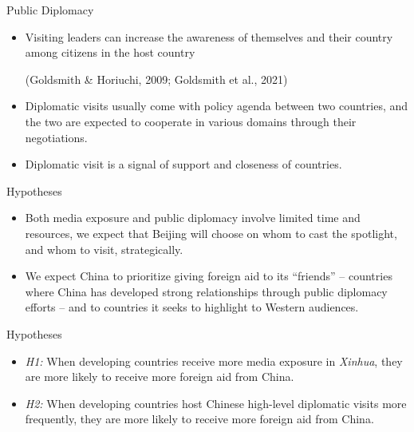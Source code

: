 \documentclass{beamer}
\begin{document}
\begin{frame}{Public Diplomacy}


\begin{itemize}
\item Visiting leaders can increase the awareness of themselves and their country among
citizens in the host country \begin{footnotesize} (Goldsmith \& Horiuchi, 2009; Goldsmith et al., 2021) \end{footnotesize}

\item Diplomatic visits usually come with policy agenda between two countries,
and the two are expected to cooperate in various domains through their negotiations.

\item Diplomatic visit is a signal of support and closeness of countries.

\end{itemize}

\end{frame}



\begin{frame}{Hypotheses}

\begin{itemize}

\item Both media exposure and public diplomacy involve limited time and resources,
we expect that Beijing will choose on whom to cast the spotlight, and whom to visit,
strategically. 

\item We expect China to prioritize giving foreign
aid to its “friends” -- countries where China has developed strong relationships through
public diplomacy efforts -- and to countries it seeks to highlight to Western audiences.

\end{itemize}

\end{frame}


\begin{frame}{Hypotheses} 

\begin{itemize} 
    \item \textit{H1:} When developing countries receive more media exposure in \textit{Xinhua}, they are more
likely to receive more foreign aid from China.
    \item \textit{H2:} When developing countries host Chinese high-level diplomatic visits more
frequently, they are more likely to receive more foreign aid from China.
\end{itemize}

\end{frame}
\end{document}
